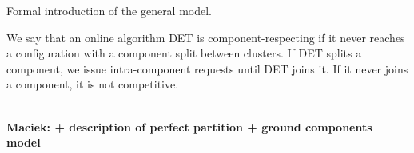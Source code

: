 \documentclass[conference]{IEEEtran}
\newcommand\maciek[1]{\color{brown}\textbf{\\ Maciek: #1}\color{black}}
\begin{document}
Formal introduction of the general model.

 We say that an online algorithm DET is component-respecting if it never reaches a configuration with a component split between clusters.
 If DET splits a component, we issue intra-component requests until DET joins it.
 If it never joins a component, it is not competitive.

 \maciek{+ description of perfect partition + ground components model}




\appendix


	
\end{document}
